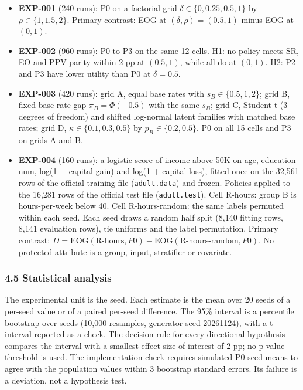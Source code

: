 \documentclass[
]{article}
\providecommand{\tightlist}{%
  \setlength{\itemsep}{0pt}\setlength{\parskip}{0pt}}
\begin{document}
\begin{itemize}
\tightlist
\item
  \textbf{EXP-001} (240 runs): P0 on a factorial grid
  \(\delta \in \{0, 0.25, 0.5, 1\}\) by \(\rho \in \{1, 1.5, 2\}\).
  Primary contrast: EOG at \((\delta, \rho) = (0.5, 1)\) minus EOG at
  \((0, 1)\).
\item
  \textbf{EXP-002} (960 runs): P0 to P3 on the same 12 cells. H1: no
  policy meets SR, EO and PPV parity within 2 pp at \((0.5, 1)\), while
  all do at \((0, 1)\). H2: P2 and P3 have lower utility than P0 at
  \(\delta = 0.5\).
\item
  \textbf{EXP-003} (420 runs): grid A, equal base rates with
  \(s_B \in \{0.5, 1, 2\}\); grid B, fixed base-rate gap
  \(\pi_B = \Phi(-0.5)\) with the same \(s_B\); grid C, Student t (3
  degrees of freedom) and shifted log-normal latent families with
  matched base rates; grid D, \(\kappa \in \{0.1, 0.3, 0.5\}\) by
  \(p_B \in \{0.2, 0.5\}\). P0 on all 15 cells and P3 on grids A and B.
\item
  \textbf{EXP-004} (160 runs): a logistic score of income above 50K on
  age, education-num, log(1 + capital-gain) and log(1 + capital-loss),
  fitted once on the 32,561 rows of the official training file
  (\texttt{adult.data}) and frozen. Policies applied to the 16,281 rows
  of the official test file (\texttt{adult.test}). Cell R-hours: group B
  is hours-per-week below 40. Cell R-hours-random: the same labels
  permuted within each seed. Each seed draws a random half split (8,140
  fitting rows, 8,141 evaluation rows), tie uniforms and the label
  permutation. Primary contrast:
  \(D = \mathrm{EOG}(\text{R-hours}, P0) - \mathrm{EOG}(\text{R-hours-random}, P0)\).
  No protected attribute is a group, input, stratifier or covariate.
\end{itemize}

\subsubsection{4.5 Statistical analysis}\label{statistical-analysis}

The experimental unit is the seed. Each estimate is the mean over 20
seeds of a per-seed value or of a paired per-seed difference. The 95\%
interval is a percentile bootstrap over seeds (10,000 resamples,
generator seed 20261124), with a t-interval reported as a check. The
decision rule for every directional hypothesis compares the interval
with a smallest effect size of interest of 2 pp; no p-value threshold is
used. The implementation check requires simulated P0 seed means to agree
with the population values within 3 bootstrap standard errors. Its
failure is a deviation, not a hypothesis test.
\end{document}
